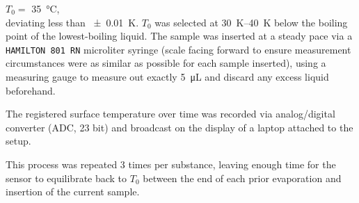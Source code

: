 $T_0=$ \qty{35}{\celsius}, 
\\deviating less than \qty{\pm 0.01}{\kelvin}. $T_0$ was selected at \qtyrange{30}{40}{\kelvin} below the boiling point of the lowest-boiling liquid. The sample was inserted at a steady pace via a \texttt{HAMILTON 801 RN} microliter syringe (scale facing forward to ensure measurement circumstances were as similar as possible for each sample inserted), using a measuring gauge to measure out exactly \qty{5}{\micro\liter} and discard any excess liquid beforehand. 

The registered surface temperature over time was recorded via analog/digital converter (ADC, 23 bit) and broadcast on the display of a laptop attached to the setup. 

This process was repeated 3 times per substance, leaving enough time for the sensor to equilibrate back to $T_0$ between the end of each prior evaporation and insertion of the current sample.
